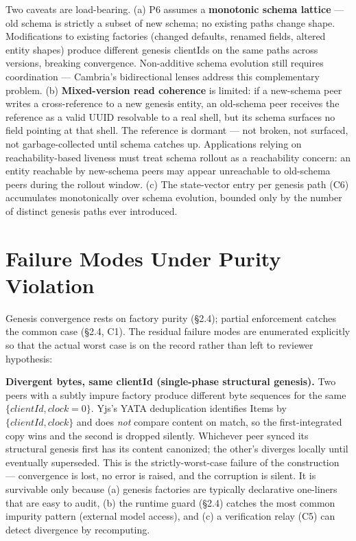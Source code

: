 Two caveats are load-bearing. (a) P6 assumes a \textbf{monotonic schema lattice} --- old schema is strictly a subset of new schema; no existing paths change shape. Modifications to existing factories (changed defaults, renamed fields, altered entity shapes) produce different genesis clientIds on the same paths across versions, breaking convergence. Non-additive schema evolution still requires coordination --- Cambria's bidirectional lenses\cite{cambria2021} address this complementary problem. (b) \textbf{Mixed-version read coherence} is limited: if a new-schema peer writes a cross-reference to a new genesis entity, an old-schema peer receives the reference as a valid UUID resolvable to a real shell, but its schema surfaces no field pointing at that shell. The reference is dormant --- not broken, not surfaced, not garbage-collected until schema catches up. Applications relying on reachability-based liveness\cite{plexus:arch} must treat schema rollout as a reachability concern: an entity reachable by new-schema peers may appear unreachable to old-schema peers during the rollout window. (c) The state-vector entry per genesis path (C6) accumulates monotonically over schema evolution, bounded only by the number of distinct genesis paths ever introduced.

\section{Failure Modes Under Purity Violation}

Genesis convergence rests on factory purity (\S2.4); partial enforcement catches the common case (\S2.4, C1). The residual failure modes are enumerated explicitly so that the actual worst case is on the record rather than left to reviewer hypothesis:

\textbf{Divergent bytes, same clientId (single-phase structural genesis).} Two peers with a subtly impure factory produce different byte sequences for the same $\{\mathit{clientId}, \mathit{clock} = 0\}$. Yjs's YATA deduplication identifies Items by $\{\mathit{clientId}, \mathit{clock}\}$ and does \emph{not} compare content on match, so the first-integrated copy wins and the second is dropped silently. Whichever peer synced its structural genesis first has its content canonized; the other's diverges locally until eventually superseded. This is the strictly-worst-case failure of the construction --- convergence is lost, no error is raised, and the corruption is silent. It is survivable only because (a) genesis factories are typically declarative one-liners that are easy to audit, (b) the runtime guard (\S2.4) catches the most common impurity pattern (external model access), and (c) a verification relay (C5) can detect divergence by recomputing.

